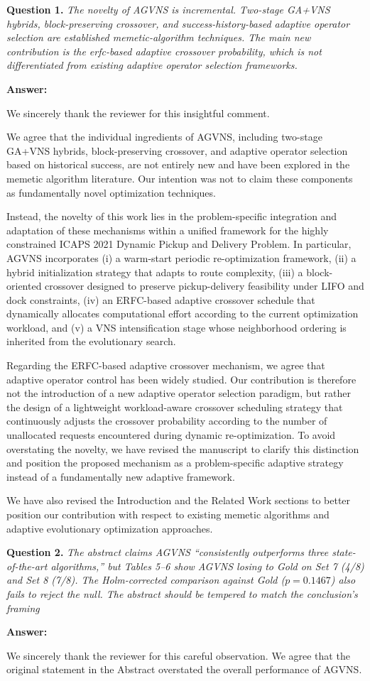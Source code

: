 \documentclass[11pt]{article}
\newcommand{\question}[2]{\vspace{0.5em}\noindent\textbf{Question #1.} \emph{#2}\par}
\newcommand{\answer}{\noindent\textbf{Answer:}\par}
\begin{document}
\question{1}{The novelty of AGVNS is incremental. Two-stage GA+VNS hybrids, block-preserving crossover, and success-history-based adaptive operator selection are established memetic-algorithm techniques. The main new contribution is the erfc-based adaptive crossover probability, which is not differentiated from existing adaptive operator selection frameworks.}
\answer
We sincerely thank the reviewer for this insightful comment.

We agree that the individual ingredients of AGVNS, including two-stage GA+VNS hybrids, block-preserving crossover, and adaptive operator selection based on historical success, are not entirely new and have been explored in the memetic algorithm literature. Our intention was not to claim these components as fundamentally novel optimization techniques.

Instead, the novelty of this work lies in the problem-specific integration and adaptation of these mechanisms within a unified framework for the highly constrained ICAPS 2021 Dynamic Pickup and Delivery Problem. In particular, AGVNS incorporates (i) a warm-start periodic re-optimization framework, (ii) a hybrid initialization strategy that adapts to route complexity, (iii) a block-oriented crossover designed to preserve pickup-delivery feasibility under LIFO and dock constraints, (iv) an ERFC-based adaptive crossover schedule that dynamically allocates computational effort according to the current optimization workload, and (v) a VNS intensification stage whose neighborhood ordering is inherited from the evolutionary search.

Regarding the ERFC-based adaptive crossover mechanism, we agree that adaptive operator control has been widely studied. Our contribution is therefore not the introduction of a new adaptive operator selection paradigm, but rather the design of a lightweight workload-aware crossover scheduling strategy that continuously adjusts the crossover probability according to the number of unallocated requests encountered during dynamic re-optimization. To avoid overstating the novelty, we have revised the manuscript to clarify this distinction and position the proposed mechanism as a problem-specific adaptive strategy instead of a fundamentally new adaptive framework.

We have also revised the Introduction and the Related Work sections to better position our contribution with respect to existing memetic algorithms and adaptive evolutionary optimization approaches.

\question{2}{The abstract claims AGVNS ``consistently outperforms three state-of-the-art algorithms,'' but Tables 5--6 show AGVNS losing to Gold on Set 7 (4/8) and Set 8 (7/8). The Holm-corrected comparison against Gold ($p = 0.1467$) also fails to reject the null. The abstract should be tempered to match the conclusion's framing}
\answer
We sincerely thank the reviewer for this careful observation. We agree that the original statement in the Abstract overstated the overall performance of AGVNS.
\end{document}
